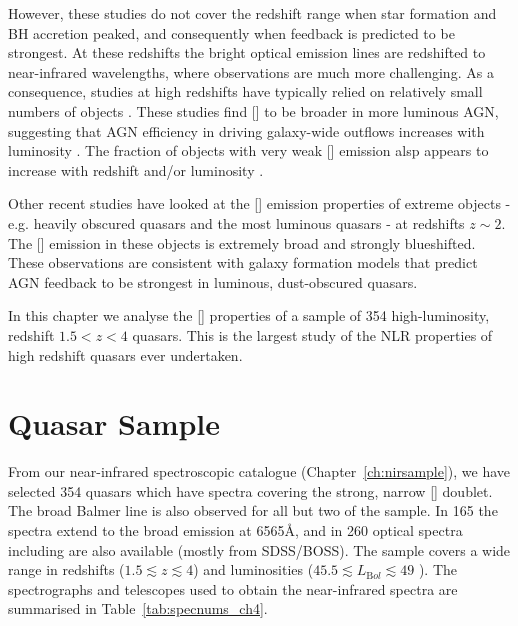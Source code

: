 However, these studies do not cover the redshift range when star formation and BH accretion peaked, and consequently when feedback is predicted to be strongest. 
At these redshifts the bright optical emission lines are redshifted to near-infrared wavelengths, where observations are much more challenging. 
As a consequence, studies at high redshifts have typically relied on relatively small numbers of objects \citep[e.g.][]{netzer04,sulentic04,shen16a}.
These studies find [] to be broader in more luminous AGN, suggesting that AGN efficiency in driving galaxy-wide outflows increases with luminosity \citep[e.g.][]{netzer04,nesvadba08,kim13,brusa15,carniani15,perna15,bischetti16}. 
The fraction of objects with very weak [] emission alsp appears to increase with redshift and/or luminosity \citep[e.g.][]{netzer04}. 

Other recent studies have looked at the [] emission properties of extreme objects - e.g. heavily obscured quasars \citep{zakamska16} and the most luminous quasars \citep{bischetti16} - at redshifts $z\sim2$. 
The [] emission in these objects is extremely broad and strongly blueshifted. 
These observations are consistent with galaxy formation models that predict AGN feedback to be strongest in luminous, dust-obscured quasars.

In this chapter we analyse the [] properties of a sample of 354 high-luminosity, redshift $1.5 < z < 4$ quasars.
This is the largest study of the NLR properties of high redshift quasars ever undertaken. 

\section{Quasar Sample}

From our near-infrared spectroscopic catalogue (Chapter~\ref{ch:nirsample}), we have selected 354 quasars which have spectra covering the strong, narrow [] doublet. 
The broad Balmer \hb line is also observed for all but two of the sample. 
In 165 the spectra extend to the broad \ha emission at 6565\AA, and in 260 optical spectra including  are also available (mostly from SDSS/BOSS). 
The sample covers a wide range in redshifts ($1.5 \lesssim z \lesssim 4$) and luminosities ($45.5 \lesssim L_{\mathrm Bol} \lesssim 49$ \ergs). 
The spectrographs and telescopes used to obtain the near-infrared spectra are summarised in Table~\ref{tab:specnums_ch4}.

